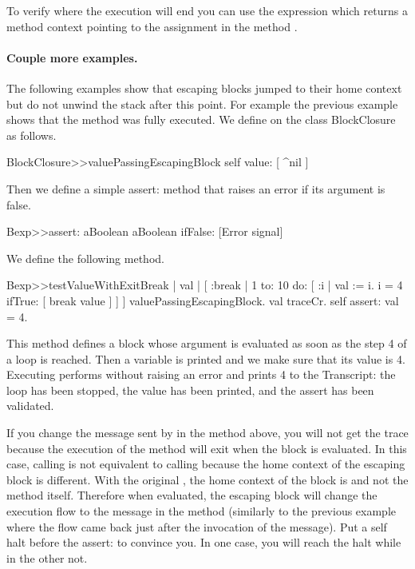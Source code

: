 \documentclass[a4paper,10pt,twoside]{book}
\begin{document}
To verify where the execution will end you can use the expression  which returns a method context pointing to the assignment in the method .

\paragraph{Couple more examples.}
The following examples show that escaping blocks jumped to their home context but do not unwind the stack after this point. For example the previous example shows that the method  was fully executed.
We define  on the class BlockClosure as follows.

\begin{code}{}
BlockClosure>>valuePassingEscapingBlock
	  self value: [ ^nil ]
\end{code}

Then we define a simple assert: method that raises an error if its argument is false.

\begin{code}{}
Bexp>>assert: aBoolean
	aBoolean ifFalse: [Error signal]
\end{code}

We define the following method.

\begin{code}{}
Bexp>>testValueWithExitBreak
	| val |
	[ :break |
	    1 to: 10 do: [ :i |
			         val := i.
			         i = 4 ifTrue: [ break value ] ] ] valuePassingEscapingBlock.
	val traceCr.
	self assert: val = 4.
\end{code}

This method defines a block whose argument  is evaluated as soon as the step 4 of a loop is reached. Then a variable  is printed and we make sure that its value is 4. Executing  performs without raising an error and prints 4 to the Transcript: the loop has been stopped, the value has been printed, and the assert has been validated.

If you change the  message sent by  in the  method above, you will not get the trace because the execution of the method  will exit when the block is evaluated. In this case, calling  is not equivalent to calling  because the home context of the escaping block \ct{[ ^ nil ]} is different.  With the original , the home context of the block \ct{[^ nil]}
is  and not the method  itself.
Therefore when evaluated, the escaping block will change the execution flow to the  message in the method  (similarly to the previous example where the flow came back just after the invocation of the  message).
Put a self halt before the assert: to convince you. In one case, you will reach the halt while in the other not.
\end{document}
